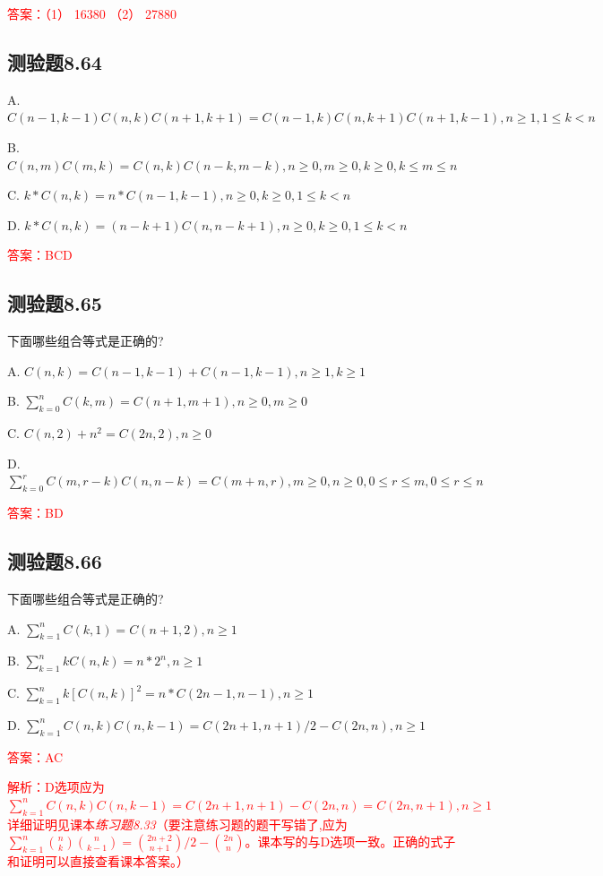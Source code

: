 \documentclass[UTF8, heading=true]{ctexart}
\begin{document}
\textcolor{red}{答案：（1） 16380 （2） 27880}


\subsection{测验题8.64}

A. $C(n-1, k-1) C(n, k) C(n+1, k+1)=C(n-1, k) C(n, k+1) C(n+1, k-1), n \geq 1,1 \leq k<n$

B. $ C(n, m) C(m, k)=C(n, k) C(n-k, m-k), n \geq 0, m \geq 0, k \geq 0, k \leq m \leq n$

C. $ k * C(n, k)=n * C(n-1, k-1),  n \geq 0, k \geq 0,1 \leq k<n$

D. $ k * C(n, k)=(n-k+1) C(n, n-k+1), n \geq 0, k \geq 0,1 \leq k<n$

\textcolor{red}{答案：BCD}

\subsection{测验题8.65}

下面哪些组合等式是正确的?

A. $C(n, k)=C(n-1, k-1)+C(n-1, k-1),  n \geq 1, k \geq 1$

B. $ \sum_{k=0}^n C(k, m)=C(n+1, m+1),  n \geq 0, m \geq 0$

C. $C(n, 2)+n^2=C(2 n, 2),  n \geq 0$

D. $ \sum_{k=0}^r C(m, r-k) C(n, n-k)=C(m+n, r), m \geq 0, n \geq 0,0 \leq r \leq m, 0 \leq r \leq n$

\textcolor{red}{答案：BD}

\subsection{测验题8.66}

下面哪些组合等式是正确的?

A. $ \sum_{k=1}^n C(k, 1)=C(n+1,2), n \geq 1$

B. $\sum_{k=1}^n k C(n, k)=n * 2^n, n \geq 1$

C. $ \sum_{k=1}^n k[C(n, k)]^2=n * C(2 n-1, n-1), n \geq 1$

D. $ \sum_{k=1}^n C(n, k) C(n, k-1)=C(2 n+1, n+1) / 2-C(2 n, n), n \geq 1$

\textcolor{red}{答案：AC}

\textcolor{red}{解析：D选项应为$ \sum_{k=1}^n C(n, k) C(n, k-1)=C(2 n+1, n+1)-C(2 n, n) = C(2n,n+1), n \geq 1$
详细证明见课本\textit{练习题8.33}（要注意练习题的题干写错了,应为$\sum_{k=1}^n\binom{n}{k}\binom{n}{k-1}=\binom{2 n+2}{n+1} / 2-\binom{2 n}{n}$。课本写的与D选项一致。正确的式子和证明可以直接查看课本答案。）}
\end{document}

